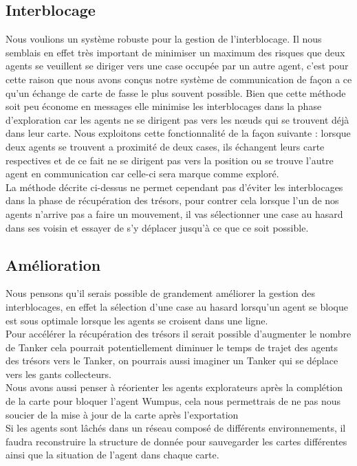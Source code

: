 \documentclass[10pt]{article}
\newcommand\tab[1][0.65cm]{\hspace*{#1}}
\begin{document}
\subsection{Interblocage}
\tab Nous voulions un système robuste pour la gestion de l'interblocage. Il nous semblais en effet très important de minimiser un maximum des risques que deux agents se veuillent se diriger vers une case occupée par un autre agent, c'est pour cette raison que nous avons conçus notre système de communication de façon a ce qu'un échange de carte de fasse le plus souvent possible. Bien que cette méthode soit peu économe en messages elle minimise les interblocages dans la phase d'exploration car les agents ne se dirigent pas vers les nœuds qui se trouvent déjà dans leur carte. Nous exploitons cette fonctionnalité de la façon suivante : lorsque deux agents se trouvent a proximité de deux cases, ils échangent leurs carte respectives et de ce fait ne se dirigent pas vers la position ou se trouve l'autre agent en communication car celle-ci sera marque comme exploré.\\
\tab La méthode décrite ci-dessus ne permet cependant pas d'éviter les interblocages dans la phase de récupération des trésors, pour contrer cela lorsque l'un de nos agents n'arrive pas a faire un mouvement, il vas sélectionner une case au hasard dans ses voisin et essayer de s'y déplacer jusqu'à ce que ce soit possible.

\subsection{Amélioration}
Nous pensons qu'il serais possible de grandement améliorer la gestion des interblocages, en effet la sélection d'une case au hasard lorsqu'un agent se bloque est sous optimale lorsque les agents se croisent dans une ligne.\\
\tab Pour accélérer la récupération des trésors il serait possible d'augmenter le nombre de Tanker cela pourrait potentiellement diminuer le temps de trajet des agents des trésors vers le Tanker, on pourrais aussi imaginer un Tanker qui se déplace vers les gants collecteurs.\\
\tab Nous avons aussi penser à réorienter les agents explorateurs après la complétion de la carte pour bloquer l'agent Wumpus, cela nous permettrais de ne pas nous soucier de la mise à jour de la carte après l'exportation\\
\tab Si les agents sont lâchés dans un réseau composé de différents environnements, il faudra reconstruire la structure de donnée pour sauvegarder les cartes différentes ainsi que la situation de l'agent dans chaque carte.
\end{document}
